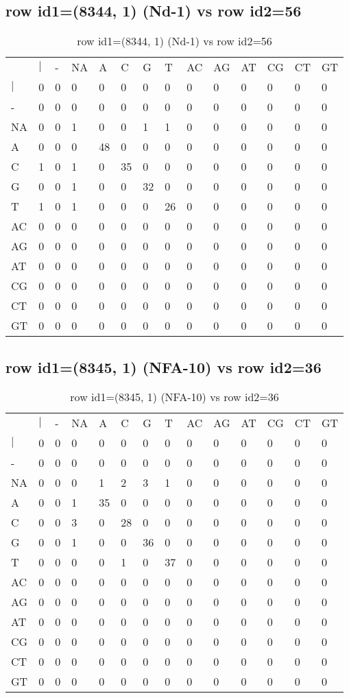 \subsection{row id1=(8344, 1) (Nd-1) vs row id2=56}
\begin{center}
\begin{longtable}{|l|l|l|l|l|l|l|l|l|l|l|l|l|l|}
\caption{row id1=(8344, 1) (Nd-1) vs row id2=56} \label{table_dm354}\\
\hline
\\
\hline
&$|$&-&NA&A&C&G&T&AC&AG&AT&CG&CT&GT\\
$|$&0&0&0&0&0&0&0&0&0&0&0&0&0\\
-&0&0&0&0&0&0&0&0&0&0&0&0&0\\
NA&0&0&1&0&0&1&1&0&0&0&0&0&0\\
A&0&0&0&48&0&0&0&0&0&0&0&0&0\\
C&1&0&1&0&35&0&0&0&0&0&0&0&0\\
G&0&0&1&0&0&32&0&0&0&0&0&0&0\\
T&1&0&1&0&0&0&26&0&0&0&0&0&0\\
AC&0&0&0&0&0&0&0&0&0&0&0&0&0\\
AG&0&0&0&0&0&0&0&0&0&0&0&0&0\\
AT&0&0&0&0&0&0&0&0&0&0&0&0&0\\
CG&0&0&0&0&0&0&0&0&0&0&0&0&0\\
CT&0&0&0&0&0&0&0&0&0&0&0&0&0\\
GT&0&0&0&0&0&0&0&0&0&0&0&0&0\\
\hline
\end{longtable}
\end{center}

\subsection{row id1=(8345, 1) (NFA-10) vs row id2=36}
\begin{center}
\begin{longtable}{|l|l|l|l|l|l|l|l|l|l|l|l|l|l|}
\caption{row id1=(8345, 1) (NFA-10) vs row id2=36} \label{table_dm356}\\
\hline
\\
\hline
&$|$&-&NA&A&C&G&T&AC&AG&AT&CG&CT&GT\\
$|$&0&0&0&0&0&0&0&0&0&0&0&0&0\\
-&0&0&0&0&0&0&0&0&0&0&0&0&0\\
NA&0&0&0&1&2&3&1&0&0&0&0&0&0\\
A&0&0&1&35&0&0&0&0&0&0&0&0&0\\
C&0&0&3&0&28&0&0&0&0&0&0&0&0\\
G&0&0&1&0&0&36&0&0&0&0&0&0&0\\
T&0&0&0&0&1&0&37&0&0&0&0&0&0\\
AC&0&0&0&0&0&0&0&0&0&0&0&0&0\\
AG&0&0&0&0&0&0&0&0&0&0&0&0&0\\
AT&0&0&0&0&0&0&0&0&0&0&0&0&0\\
CG&0&0&0&0&0&0&0&0&0&0&0&0&0\\
CT&0&0&0&0&0&0&0&0&0&0&0&0&0\\
GT&0&0&0&0&0&0&0&0&0&0&0&0&0\\
\hline
\end{longtable}
\end{center}

